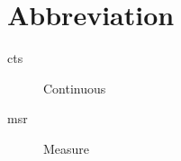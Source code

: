 \section{Abbreviation}

\begin{description}
  \item[cts] Continuous
  \item[msr] Measure
\end{description}